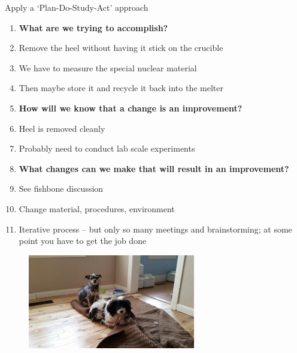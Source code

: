 \documentclass[aspectratio=1610,pdftex,dvipsnames,compress,xcolor={dvipsnames}]{beamer}
\begin{document}
\begin{frame}{Apply a `Plan-Do-Study-Act' approach}
    \begin{enumerate}[series=outerlist,topsep=0pt,itemsep=3pt,leftmargin=*,label=(\arabic*)]
        \item[]\textbf{What are we trying to accomplish?}
        \item[]Remove the heel without having it stick on the crucible  
        \item[]We have to measure the special nuclear material
        \item[]Then maybe store it and recycle it back into the melter
            \vspace{0.10in}
        \item[]\textbf{How will we know that a change is an improvement?}
        \item[]Heel is removed cleanly  
        \item[]Probably need to conduct lab scale experiments 
            \vspace{0.10in}
        \item[]\textbf{What changes can we make that will result in an improvement?}
        \item[]See fishbone discussion  
        \item[]Change material, procedures, environment  
            \vspace{0.10in}
        \item[]Iterative process -- but only so many meetings and brainstorming; at some point you have to get the job done
    \end{enumerate}
\end{frame}


\begin{frame}[plain]{}
    \begin{figure}
        \centering
        \includegraphics[width=0.65\textwidth]{final.jpg}
    \end{figure}
\end{frame}
\end{document}
